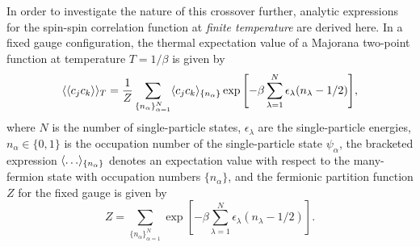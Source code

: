 In order to investigate the nature of this crossover further, analytic expressions for the spin-spin correlation function at \textit{finite temperature} are derived here.
In a fixed gauge configuration, the thermal expectation value of a Majorana two-point function at temperature $T=1/\beta$ is given by
%
\begin{equation}
	\langle \langle c_j c_k \rangle \rangle_{T} = \frac{1}{Z} \sum_{\{n_\alpha\}_{\alpha=1}^N} \langle c_j c_k \rangle_{\{n_\alpha\}} \exp{\left[ -\beta\sum_{\lambda=1}^N \epsilon_\lambda (n_\lambda-1/2) \right]},
\end{equation}
%
where $N$ is the number of single-particle states, $\epsilon_{\lambda}$ are the single-particle energies, $n_\alpha \in \{ 0, 1\}$ is the occupation number of the single-particle state $\psi_\alpha$, the bracketed expression $\langle \ldots \rangle_{\{n_\alpha\}}$ denotes an expectation value with respect to the many-fermion state with occupation numbers $\{n_\alpha\}$, and the fermionic partition function $Z$ for the fixed gauge is given by
%
\begin{equation}
	Z = \sum_{\{n_\alpha\}_{\alpha=1}^N} \exp{\left[ -\beta \sum_{\lambda=1}^N \epsilon_\lambda (n_\lambda - 1/2) \right]}.
\end{equation}
%

